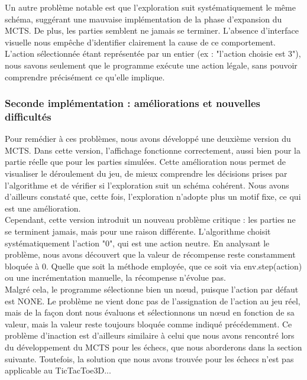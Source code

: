 \documentclass{article}
\begin{document}
    Un autre problème notable est que l’exploration suit systématiquement le même schéma, suggérant une mauvaise implémentation de la phase d’expansion du MCTS. De plus, les parties semblent ne jamais se terminer. L’absence d’interface visuelle nous empêche d’identifier clairement la cause de ce comportement. L'action sélectionnée étant représentée par un entier (ex : "l’action choisie est 3"), nous savons seulement que le programme exécute une action légale, sans pouvoir comprendre précisément ce qu’elle implique.

    \subsubsection{Seconde implémentation : améliorations et nouvelles difficultés}
    
    \quad Pour remédier à ces problèmes, nous avons développé une deuxième version du MCTS. Dans cette version, l’affichage fonctionne correctement, aussi bien pour la partie réelle que pour les parties simulées. Cette amélioration nous permet de visualiser le déroulement du jeu, de mieux comprendre les décisions prises par l’algorithme et de vérifier si l’exploration suit un schéma cohérent. Nous avons d’ailleurs constaté que, cette fois, l’exploration n’adopte plus un motif fixe, ce qui est une amélioration.\\
    
    Cependant, cette version introduit un nouveau problème critique : les parties ne se terminent jamais, mais pour une raison différente. L’algorithme choisit systématiquement l’action "0", qui est une action neutre. En analysant le problème, nous avons découvert que la valeur de récompense reste constamment bloquée à 0. Quelle que soit la méthode employée, que ce soit via env.step(action) ou une incrémentation manuelle, la récompense n’évolue pas.\\

    Malgré cela, le programme sélectionne bien un nœud, puisque l’action par défaut est NONE. Le problème ne vient donc pas de l’assignation de l’action au jeu réel, mais de la façon dont nous évaluons et sélectionnons un nœud en fonction de sa valeur, mais la valeur reste toujours bloquée comme indiqué précédemment. Ce problème d'inaction est d’ailleurs similaire à celui que nous avons rencontré lors du développement du MCTS pour les échecs, que nous aborderons dans la section suivante. Toutefois, la solution que nous avons trouvée pour les échecs n’est pas applicable au TicTacToe3D...
\end{document}
